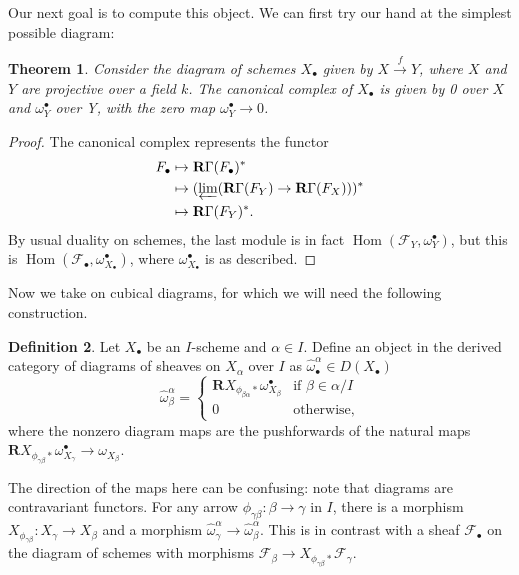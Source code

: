 \documentclass[proquest]{uwthesis}[2014/11/13]
\newtheorem{theorem}{Theorem}[section]
\theoremstyle{definition}
\newtheorem{definition}[theorem]{Definition}
\DeclareMathOperator{\Hom}{Hom}
\newcommand{\FF}{\mathscr{F}}
\newcommand{\bR}{\textbf{R}}
\begin{document}
Our next goal is to compute this object.
We can first try our hand at the simplest possible diagram:
\begin{theorem}
	Consider the diagram of schemes $X_\bullet$ given by $X \xrightarrow{f} Y$, where $X$ and $Y$ are projective over a field $k$.
	The canonical complex of $X_\bullet$ is given by 0 over $X$ and $\omega^\bullet_Y$ over Y, with the zero map $\omega^\bullet_Y \rightarrow 0$.
\end{theorem}
\begin{proof}
	The canonical complex represents the functor
	\begin{align*}
	F_\bullet &\mapsto \bR \Gamma (F_\bullet)^* \\
	&\mapsto (\varprojlim (\bR \Gamma (F_Y) \rightarrow \bR \Gamma (F_X)))^* \\
	&\mapsto \bR \Gamma (F_Y)^*.
	\end{align*}
	By usual duality on schemes, the last module is in fact $\Hom(\FF_Y, \omega_Y^\bullet)$, but this is $\Hom(\FF_\bullet, \omega^\bullet_{X_\bullet})$, where $\omega^\bullet_{X_\bullet}$ is as described.
\end{proof}

Now we take on cubical diagrams, for which we will need the following construction.
\begin{definition}
	Let $X_\bullet$ be an $I$-scheme and $\alpha \in I$.
	Define an object in the derived category of diagrams of sheaves on $X_\alpha$ over $I$ as $\hat{\omega}_\bullet^\alpha \in D(X_\bullet)$
	\[
		\hat{\omega}^\alpha_\beta =  \begin{cases}
											\bR X_{\phi_{\beta \alpha} *} \omega_{X_\beta}^\bullet & \text{if } \beta \in \alpha / I \\
											0 & \text{otherwise,}
									\end{cases}
	\]
	where the nonzero diagram maps are the pushforwards of the natural maps $\bR X_{\phi_{\gamma \beta} *} \omega_{X_\gamma}^\bullet \rightarrow \omega_{X_\beta}$.

	The direction of the maps here can be confusing: note that diagrams are contravariant functors.
	For any arrow $\phi_{\gamma \beta} : \beta \rightarrow \gamma$ in $I$, there is a morphism $X_{\phi_{\gamma \beta}} : X_\gamma \rightarrow X_\beta$ and a morphism $\hat{\omega}^\alpha_\gamma \rightarrow \hat{\omega}^\alpha_\beta$.
	This is in contrast with a sheaf $\FF_\bullet$ on the diagram of schemes with morphisms $\FF_\beta \rightarrow X_{\phi_{\gamma \beta} *} \FF_\gamma$.
\end{definition}
\end{document}
